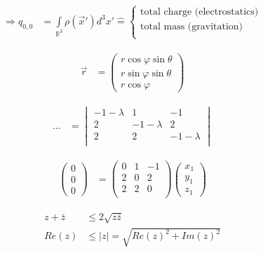 \documentclass[12pt, a4paper, twopage]{scrartcl}
\newcommand{\corresponds}{\mathrel{\widehat{=}}}       %
\begin{document}
\begin{align}
	 \nonumber
	 \Rightarrow q_{0, 0} &= \int \limits_{\mathbb{R}^3} \rho(\vec{x}' ) d^3 x' \corresponds 
	 \begin{cases} 
	 \text{total charge (electrostatics)} \\
	 \text{total mass (gravitation)}\\
	 \end{cases}
\end{align}


\begin{align}
	 \vec{r} &= \left( \begin{matrix}
	 r \cos \varphi \sin \theta\\
	 r \sin \varphi \sin \theta\\
	 r \cos \varphi
	 \end{matrix} \right )
\end{align}


\begin{align}
	 ... &=\begin{vmatrix}
		  -1-\lambda & 1 & -1 \\
		  2 & -1-\lambda & 2\\
		  2 & 2 & -1-\lambda\\
		  \end{vmatrix}
\end{align}


\begin{align}
	 \begin{pmatrix}
	 	0\\0\\0
	 \end{pmatrix} &= 
	 \begin{pmatrix}
		 0 & 1 & -1 \\
		 2 & 0 & 2\\
		 2 & 2 & 0\\
	 \end{pmatrix} 
	 \begin{pmatrix}
		 x_1 \\ y_1\\ z_1
	 \end{pmatrix}
\end{align}


\begin{align}
	 z + \bar{z} &\leq 2\sqrt{z\bar{z}} \tag*{:2} \\\nonumber	 
	 Re(z) &\leq |z| = \sqrt{Re(z)^2 + Im(z)^2} \tag*{$\square$}
\end{align}
\end{document}
